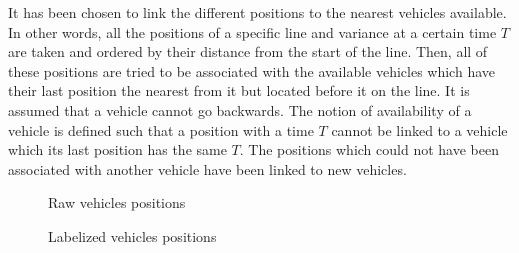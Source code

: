 \documentclass{article}
\begin{document}
It has been chosen to link the different positions to the nearest vehicles available.
In other words, all the positions of a specific line and variance at a certain time $T$ are taken and ordered by their distance from the start of the line. Then, all of these positions are tried to be associated with the available vehicles which have their last position the nearest from it but located before it on the line. It is assumed that a vehicle cannot go backwards. The notion of availability of a vehicle is defined such that a position with a time $T$ cannot be linked to a vehicle which its last position has the same $T$. The positions which could not have been associated with another vehicle have been linked to new vehicles.

\begin{figure}[H]%
    \centering
    \qquad
    \caption{Raw vehicles positions}%
\end{figure}

\begin{figure}[H]%
    \centering
    \qquad
    \caption{Labelized vehicles positions}%
\end{figure}
\end{document}
